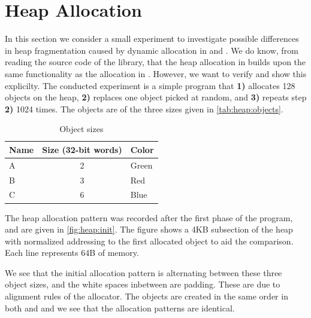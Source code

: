\section{Heap Allocation}
\label{sec:res:heap}
In this section we consider a small experiment to investigate possible differences in heap fragmentation caused by dynamic allocation in {\C} and {\rust}.
We do know, from reading the source code of the library, that the heap allocation in {\rust} builds upon the same functionality as the allocation in {\C}.
However, we want to verify and show this explicilty.
The conducted experiment is a simple program that \textbf{1)} allocates 128 objects on the heap, \textbf{2)} replaces one object picked at random, and \textbf{3)} repeats step \textbf{2)} 1024 times.
The objects are of the three sizes given in \autoref{tab:heap:objects}.

\begin{table}[H]
  \centering
  \begin{tabular}{l|c|l}
    \textbf{Name} & \textbf{Size (32-bit words)} & \textbf{Color} \\
    \hline
    A & 2 & Green \\
    B & 3 & Red \\
    C & 6 & Blue \\
    \hline
  \end{tabular}
  \caption{Object sizes}
  \label{tab:heap:objects}
\end{table}

The heap allocation pattern was recorded after the first phase of the program, and are given in \autoref{fig:heap:init}.
The figure shows a 4KB subsection of the heap with normalized addressing to the first allocated object to aid the comparison.
Each line represents 64B of memory.

We see that the initial allocation pattern is alternating between these three object sizes, and the white spaces inbetween are padding.
These are due to alignment rules of the allocator.
The objects are created in the same order in both {\C} and {\rust} and we see that the allocation patterns are identical.

